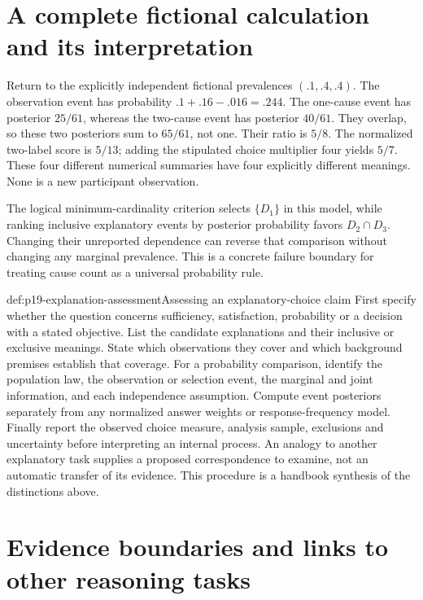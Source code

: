 \section{A complete fictional calculation and its interpretation}
\label{sec:p19-explanation-worked}

Return to the explicitly independent fictional prevalences
\((.1,.4,.4)\). The observation event has probability
\(.1+.16-.016=.244\).
The one-cause event has posterior \(25/61\), whereas the
two-cause event has posterior \(40/61\).
They overlap, so these two posteriors sum to \(65/61\), not one.
Their ratio is \(5/8\).
The normalized two-label score is \(5/13\);
adding the stipulated choice multiplier four yields \(5/7\).
These four different numerical summaries have four explicitly
different meanings. None is a new participant observation.

The logical minimum-cardinality criterion selects \(\{D_1\}\)
in this model, while ranking inclusive explanatory events by
posterior probability favors \(D_2\cap D_3\).
Changing their unreported dependence can reverse that comparison
without changing any marginal prevalence.
This is a concrete failure boundary for treating cause count
as a universal probability rule.

\begin{hbmethod}{def:p19-explanation-assessment}{Assessing an explanatory-choice claim}
First specify whether the question concerns sufficiency, satisfaction,
probability or a decision with a stated objective.
List the candidate explanations and their inclusive or exclusive
meanings. State which observations they cover and which background
premises establish that coverage.
For a probability comparison, identify the population law, the
observation or selection event, the marginal and joint information,
and each independence assumption.
Compute event posteriors separately from any normalized answer
weights or response-frequency model.
Finally report the observed choice measure, analysis sample,
exclusions and uncertainty before interpreting an internal process.
An analogy to another explanatory task supplies a proposed
correspondence to examine, not an automatic transfer of its evidence.
This procedure is a handbook synthesis of the distinctions above.
\end{hbmethod}

\section{Evidence boundaries and links to other reasoning tasks}
\label{sec:p19-explanation-evidence-boundary}

